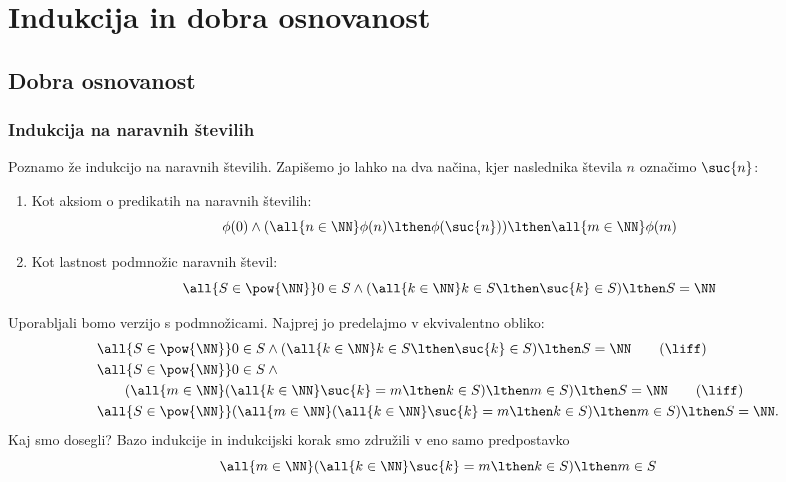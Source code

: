 \chapter{Indukcija in dobra osnovanost}

\section{Dobra osnovanost}

\subsection{Indukcija na naravnih številih}

Poznamo že indukcijo na naravnih številih. Zapišemo jo lahko na dva načina,
kjer naslednika števila $n$ označimo $\suc{n}$:
%
\begin{enumerate}
\item Kot aksiom o predikatih na naravnih številih:
  \begin{equation*}
  \phi(0) \land (\all{n \in \NN} \phi(n) \lthen \phi(\suc{n})) \lthen \all{m \in \NN} \phi(m)
  \end{equation*}

\item Kot lastnost podmnožic naravnih števil:
  \begin{equation*}
    \all{S \in \pow{\NN}} 0 \in S \land (\all{k \in \NN} k \in S \lthen \suc{k} \in S) \lthen S = \NN
  \end{equation*}
\end{enumerate}
%
Uporabljali bomo verzijo s podmnožicami. Najprej jo predelajmo v ekvivalentno obliko:
%
\begin{align}
  &\all{S \in \pow{\NN}} 0 \in S \land (\all{k \in \NN} k \in S \lthen \suc{k} \in S) \lthen S = \NN \tag{$\liff$} \\
  &\all{S \in \pow{\NN}} 0 \in S \land {} \notag \\
  &\qquad (\all{m \in \NN} (\all{k \in \NN} \suc{k} = m \lthen k \in S) \lthen m \in S) \lthen S = \NN \tag{$\liff$} \\
  &\all{S \in \pow{\NN}} (\all{m \in \NN} (\all{k \in \NN} \suc{k} = m \lthen k \in S) \lthen m \in S) \lthen S = \NN. \notag
\end{align}
%
Kaj smo dosegli? Bazo indukcije in indukcijski korak smo združili v eno samo predpostavko
%
\begin{equation}
  \label{eq:ind-N}
  \all{m \in \NN} (\all{k \in \NN} \suc{k} = m \lthen k \in S) \lthen m \in S
\end{equation}
